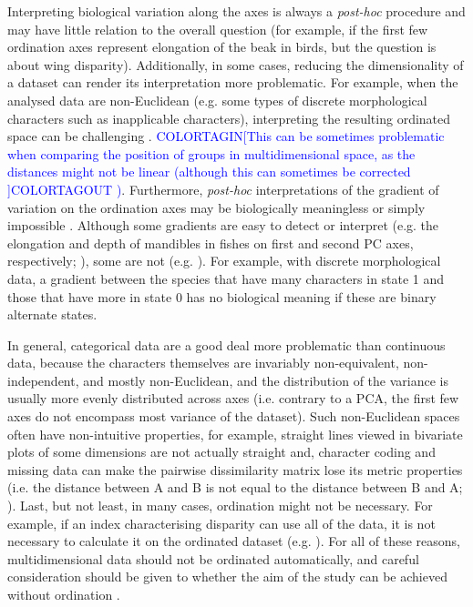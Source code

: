\documentclass[12pt,letterpaper]{article}
\begin{document}
Interpreting biological variation along the axes is always a \textit{post-hoc} procedure and may have little relation to the overall question (for example, if the first few ordination axes represent elongation of the beak in birds, but the question is about wing disparity).
Additionally, in some cases, reducing the dimensionality of a dataset can render its interpretation more problematic.
For example, when the analysed data are non-Euclidean (e.g. some types of discrete morphological characters such as inapplicable characters), interpreting the resulting ordinated space can be challenging \citep{Gerber2019}.
\textcolor{blue}{COLORTAGIN[This can be sometimes problematic when comparing the position of groups in multidimensional space, as the distances might not be linear (although this can sometimes be corrected ]COLORTAGOUT \citealt{cailliez1983})}.
Furthermore, \textit{post-hoc} interpretations of the gradient of variation on the ordination axes may be biologically meaningless or simply impossible \citep{Gerber2019}.
Although some gradients are easy to detect or interpret (e.g.
the elongation and depth of mandibles in fishes on first and second PC axes, respectively; \citealt{Hill2018}), some are not (e.g. \citealt{Weisbecker2019}).
For example, with discrete morphological data, a gradient between the species that have many characters in state 1 and those that have more in state 0 has no biological meaning if these are binary alternate states.

In general, categorical data are a good deal more problematic than continuous data, because the characters themselves are invariably non-equivalent, non-independent, and mostly non-Euclidean, and the distribution of the variance is usually more evenly distributed across axes (i.e. contrary to a PCA, the first few axes do not encompass most variance of the dataset).
Such non-Euclidean spaces often have non-intuitive properties, for example, straight lines viewed in bivariate plots of some dimensions are not actually straight and, character coding and missing data can make the pairwise dissimilarity matrix lose its metric properties (i.e. the distance between A and B is not equal to the distance between B and A; \citealt{Gerber2014}).
Last, but not least, in many cases, ordination might not be necessary.
For example, if an index characterising disparity can use all of the data, it is not necessary to calculate it on the ordinated dataset (e.g. \citealt{Close2015}).
For all of these reasons, multidimensional data should not be ordinated automatically, and careful consideration should be given to whether the aim of the study can be achieved without ordination \citep{lloyd2016,lloyd2018}.
\end{document}
